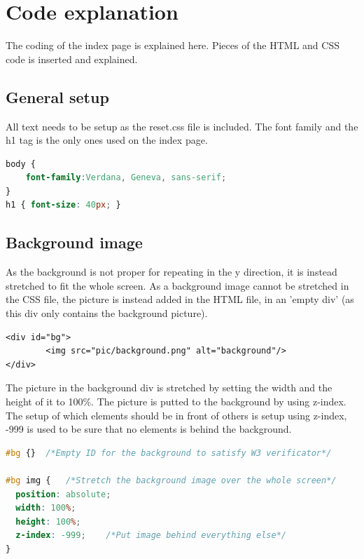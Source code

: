 \section{Code explanation}
The coding of the index page is explained here. Pieces of the HTML and CSS code is inserted and explained.
\subsection{General setup}
All text needs to be setup as the reset.css file is included. The font family and the h1 tag is the only ones used on the index page. 
\begin{lstlisting}[language=CSS]
body {
	font-family:Verdana, Geneva, sans-serif;
}
h1 { font-size: 40px; }
\end{lstlisting}

\subsection{Background image}
As the background is not proper for repeating in the y direction, it is instead stretched to fit the whole screen. As a background image cannot be stretched in the CSS file, the picture is instead added in the HTML file, in an 'empty div' (as this div only contains the background picture).
\begin{lstlisting}
<div id="bg">
		<img src="pic/background.png" alt="background"/>
</div>
\end{lstlisting}
The picture in the background div is stretched by setting the width and the height of it to 100\%. The picture is putted to the background by using z-index. The setup of which elements should be in front of others is setup using z-index, -999 is used to be sure that no elements is behind the background.
\begin{lstlisting}[language=CSS] 
#bg {}	/*Empty ID for the background to satisfy W3 verificator*/
		
#bg img {	/*Stretch the background image over the whole screen*/
  position: absolute;
  width: 100%;
  height: 100%;
  z-index: -999;	/*Put image behind everything else*/
}
\end{lstlisting}

